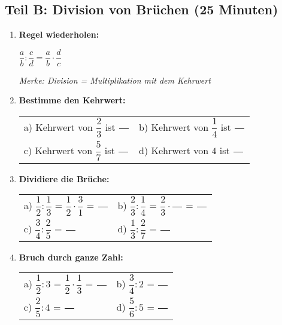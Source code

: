 \subsection*{Teil B: Division von Brüchen (25 Minuten)}

\begin{enumerate}[label=\arabic*.]
    \item \textbf{Regel wiederholen:}
    \vspace{0.5cm}

    $\dfrac{a}{b} : \dfrac{c}{d} = \dfrac{a}{b} \cdot \dfrac{d}{c}$

    \textit{Merke: Division = Multiplikation mit dem Kehrwert}

    \vspace{1cm}

    \item \textbf{Bestimme den Kehrwert:}
    \vspace{0.5cm}

    \begin{tabular}{ll}
        a) Kehrwert von $\dfrac{2}{3}$ ist $\dfrac{\phantom{00}}{\phantom{00}}$ & b) Kehrwert von $\dfrac{1}{4}$ ist $\dfrac{\phantom{00}}{\phantom{00}}$ \\[3ex]
        c) Kehrwert von $\dfrac{5}{7}$ ist $\dfrac{\phantom{00}}{\phantom{00}}$ & d) Kehrwert von $4$ ist $\dfrac{\phantom{00}}{\phantom{00}}$
    \end{tabular}

    \vspace{1cm}

    \item \textbf{Dividiere die Brüche:}
    \vspace{0.5cm}

    \begin{tabular}{ll}
        a) $\dfrac{1}{2} : \dfrac{1}{3}$ = $\dfrac{1}{2} \cdot \dfrac{3}{1}$ = $\dfrac{\phantom{00}}{\phantom{00}}$ & b) $\dfrac{2}{3} : \dfrac{1}{4}$ = $\dfrac{2}{3} \cdot \dfrac{\phantom{00}}{\phantom{00}}$ = $\dfrac{\phantom{00}}{\phantom{00}}$ \\[4ex]
        c) $\dfrac{3}{4} : \dfrac{2}{5}$ = $\dfrac{\phantom{00}}{\phantom{00}}$ & d) $\dfrac{1}{3} : \dfrac{2}{7}$ = $\dfrac{\phantom{00}}{\phantom{00}}$
    \end{tabular}

    \vspace{1cm}

    \item \textbf{Bruch durch ganze Zahl:}
    \vspace{0.5cm}

    \begin{tabular}{ll}
        a) $\dfrac{1}{2} : 3$ = $\dfrac{1}{2} \cdot \dfrac{1}{3}$ = $\dfrac{\phantom{00}}{\phantom{00}}$ & b) $\dfrac{3}{4} : 2$ = $\dfrac{\phantom{00}}{\phantom{00}}$ \\[4ex]
        c) $\dfrac{2}{5} : 4$ = $\dfrac{\phantom{00}}{\phantom{00}}$ & d) $\dfrac{5}{6} : 5$ = $\dfrac{\phantom{00}}{\phantom{00}}$
    \end{tabular}

\end{enumerate}